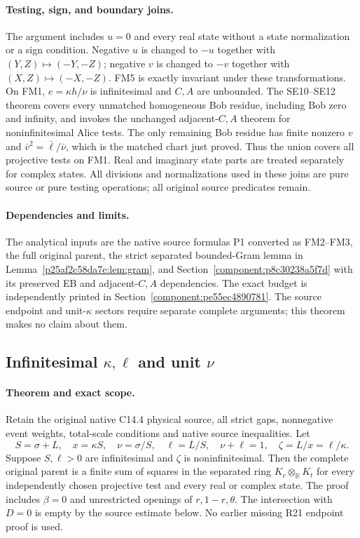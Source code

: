 \paragraph{Testing, sign, and boundary joins.}
The argument includes $u=0$ and every real state without a state
normalization or a sign condition. Negative $u$ is changed to
$-u$ together with $(Y,Z)\mapsto(-Y,-Z)$; negative $v$ is
changed to $-v$ together with $(X,Z)\mapsto(-X,-Z)$.
FM5 is exactly invariant under these transformations. On FM1,
$e=\kappa h/\nu$ is infinitesimal and $C,A$ are unbounded.
The SE10--SE12 theorem covers every unmatched
homogeneous Bob residue, including Bob zero and infinity,
and invokes the unchanged adjacent-$C,A$ theorem for
noninfinitesimal Alice tests. The only remaining Bob residue
has finite nonzero $v$ and $\bar v^2=\bar\ell/\bar\nu$,
which is the matched chart just proved. Thus the union covers
all projective tests on FM1. Real and imaginary state parts
are treated separately for complex states. All divisions and
normalizations used in these joins are pure source or pure
testing operations; all original source predicates remain.

\paragraph{Dependencies and limits.}
The analytical inputs are the native source formulas
P1 converted as FM2--FM3, the full original parent, the strict
separated bounded-Gram lemma in Lemma~\ref{p25af2c58da7e:lem:gram},
and Section~\ref{component:p8c30238a5f7d}
with its preserved EB and adjacent-$C,A$ dependencies.
The exact budget is independently printed in
Section~\ref{component:pe55ec4890781}. The source endpoint
and unit-$\kappa$ sectors require separate complete arguments;
this theorem makes no claim about them.



\subsection{Infinitesimal $\kappa,\ell$ and unit $\nu$}

\label{component:pb96c9bfcc12d}

\label{pb96c9bfcc12d:sec:c144-ell-endpoint-rederived}

\paragraph{Theorem and exact scope.}
Retain the original native C14.4 physical source, all strict gaps,
nonnegative event weights, total-scale conditions and native source inequalities.  Let
\[
 S=\sigma+L,\quad x=\kappa S,\quad
 \nu=\sigma/S,\quad\ell=L/S,\quad\nu+\ell=1,
 \quad\zeta=L/x=\ell/\kappa.
\]
Suppose $S,\ell>0$ are infinitesimal and $\zeta$ is
noninfinitesimal.  Then the complete original parent is a finite
sum of squares in the separated ring
$K_c\otimes_{\mathbb R}K_t$ for every independently chosen
projective test and every real or complex state.  The proof includes
$\beta=0$ and unrestricted openings of $r,1-r,\theta$.
The intersection with $D=0$ is empty by the source estimate below.
No earlier missing R21 endpoint proof is used.

